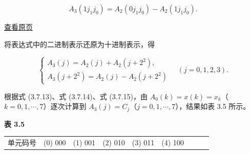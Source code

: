 \documentclass[
  10pt,
  fontset=fandol]{ctexart}
\newcounter{none} %
\begin{document}
\[
A_3(1j_1j_0)=A_2(0j_1j_0)-A_2(1j_1j_0).
\]

\href{../../source-images/pdf-089.jpeg}{查看原页}

将表达式中的二进制表示还原为十进制表示，得

\[
\begin{cases}
A_3(j)=A_2(j)+A_2(j+2^2),\\
A_3(j+2^2)=A_2(j)-A_2(j+2^2)
\end{cases}\quad(j=0,1,2,3).\tag{3.7.15}
\]

根据式 (3.7.13)、式 (3.7.14)、式 (3.7.15)，由 \(A_0(k)=x(k)=x_k\)（\(k=0,1,\cdots,7\)）逐次计算到 \(A_3(j)=C_j\)（\(j=0,1,\cdots,7\)），结果如表 3.5 所示。

\textbf{表 3.5}

{\def\LTcaptype{none} %
\begin{longtable}[]{@{}
  >{\raggedright\arraybackslash}p{}
  >{\raggedright\arraybackslash}p{}
  >{\raggedright\arraybackslash}p{}
  >{\raggedright\arraybackslash}p{}
  >{\raggedright\arraybackslash}p{}
  >{\raggedright\arraybackslash}p{}
  >{\raggedright\arraybackslash}p{}
  >{\raggedright\arraybackslash}p{}
  >{\raggedright\arraybackslash}p{}@{}}
\toprule\noalign{}
\begin{minipage}[b]{\linewidth}\raggedright
单元码号
\end{minipage} & \begin{minipage}[b]{\linewidth}\raggedright
(0) 000
\end{minipage} & \begin{minipage}[b]{\linewidth}\raggedright
(1) 001
\end{minipage} & \begin{minipage}[b]{\linewidth}\raggedright
(2) 010
\end{minipage} & \begin{minipage}[b]{\linewidth}\raggedright
(3) 011
\end{minipage} & \begin{minipage}[b]{\linewidth}\raggedright
(4) 100
\end{minipage} & \begin{minipage}[b]{\linewidth}\raggedright

\end{minipage}
\end{longtable}}
\end{document}
